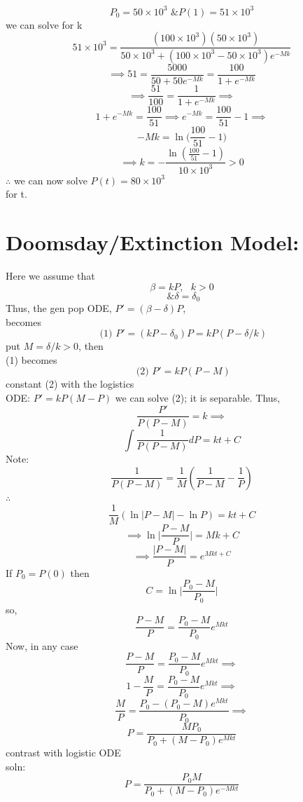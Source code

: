 \documentclass[10pt,a4paper]{article}
\begin{document}
  \[ P_0 = 50 \times 10^3 \text{ \&   } P(1) = 51 \times 10^3 \]
  we can solve for k
  \[ 51 \times 10^3 = \frac{(100 \times 10^3) (50 \times 10^3)}{ 50
  \times 10^3 + (100 \times 10^3 - 50 \times 10^3) e^{-Mk}} \]
  \[ \implies 51 = \frac{5000}{50 +50e^{-Mk}} = \frac{100}{1+e^{-Mk}} \]
  \[ \implies \frac{51}{100} = \frac{1}{1+e^{-Mk}} \implies  \]
  \[  1+ e^{-Mk} = \frac{100}{51} \implies  e^{-Mk} = \frac{100}{51} -1
  \implies \]
  \[ -Mk = \ln \bigg( \frac{100}{51} -1 \bigg) \]
  \[ \implies k= - \frac{\ln ( \frac{100}{51} - 1)}{10 \times 10^3} > 0 \]
  \( \therefore  \) we can now solve \( P(t) = 80 \times 10^3 \) \\
  for t. \\

\section*{Doomsday/Extinction Model:} 
  Here we assume that 
  \[ \beta = kP, \text{  } k>0 \]
  \[ \text{ \& } \delta  = \delta_0 \]
  Thus, the gen pop ODE, \( P' = (\beta -\delta )P \), \\
  becomes \\
  \[ \text{ (1) } P' = (kP-\delta_0)P = kP(P-\delta/k )  \]
  put \( M = \delta / k > 0 \), then \\
  (1) becomes 
  \[ \text{ (2) } P' = kP(P-M) \]
  constant (2) with the logistics \\
  ODE: \( P' =kP(M-P) \) we 
  can solve (2); it is separable. Thus,
  \[ \frac{P'}{P(P-M)}= k \implies  \]
  \[ \int \frac{1}{P(P-M)}dP = kt + C \]
  Note:
  \[ \frac{1}{P(P-M)} = \frac{1}{M}( \frac{1}{P-M}- \frac{1}{P}) \]
  \( \therefore  \)
  \[ \frac{1}{M}( \ln|P-M| - \ln P ) = kt + C \]
  \[ \implies \ln  \bigg| \frac{P-M}{P}\bigg| = Mk + C \]
  \[ \implies \frac{|P-M|}{P} = e^{Mkt+C} \]
  If \( P_0 = P(0) \) then 
  \[ C = \ln \bigg|\frac{P_0-M}{P_0}\bigg| \]
  so,
  \[ \frac{P-M}{P} = \frac{P_0-M}{P_0}e^{Mkt} \]
  Now, in any case 
  \[ \frac{P-M}{P} = \frac{P_0 - M}{P_0}e^{Mkt} \implies \]
  \[ 1 - \frac{M}{P} = \frac{P_0-M}{P_0}e^{Mkt} \implies  \]
  \[ \frac{M}{P} = \frac{P_0- (P_0 -M) e^{Mkt} }{P_0} \implies  \]
  \[ \boxed{P = \frac{MP_0}{P_0 + (M-P_0)e^{Mkt}} } \]
  contrast with logistic ODE \\
  soln: 
  \[ P = \frac{P_0M}{P_0 + (M-P_0)e^{-Mkt}} \]


  \newpage
\end{document}
